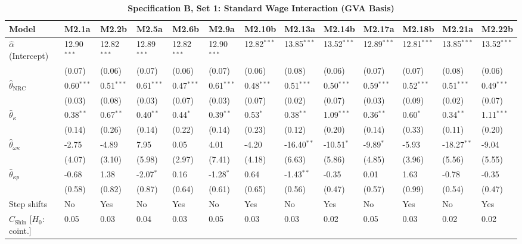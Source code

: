 \FloatBarrier
\begin{table}[h!]
\centering
\caption{\textbf{Specification B, Set 1: Standard Wage Interaction (GVA Basis)}}
\label{tab:specB_set1_gva_app}
\tiny
\setlength{\tabcolsep}{1.5pt}
\begin{tabular}{p{3.2cm}p{1.0cm}p{1.0cm}p{1.0cm}p{1.0cm}p{1.0cm}p{1.0cm}p{1.0cm}p{1.0cm}p{1.0cm}p{1.0cm}p{1.0cm}p{1.0cm}}
\toprule
Model & M2.1a & M2.2b & M2.5a & M2.6b & M2.9a & M2.10b & M2.13a & M2.14b & M2.17a & M2.18b & M2.21a & M2.22b \\
\midrule
$\hat{\alpha}$ (Intercept) & 12.90$^{***}$ & 12.82$^{***}$ & 12.89$^{***}$ & 12.82$^{***}$ & 12.90$^{***}$ & 12.82$^{***}$ & 13.85$^{***}$ & 13.52$^{***}$ & 12.89$^{***}$ & 12.81$^{***}$ & 13.85$^{***}$ & 13.52$^{***}$ \\
 & (0.07) & (0.06) & (0.07) & (0.06) & (0.07) & (0.06) & (0.08) & (0.06) & (0.07) & (0.07) & (0.08) & (0.06) \\
$\hat{\theta}_{\text{NRC}}$ & 0.60$^{***}$ & 0.51$^{***}$ & 0.61$^{***}$ & 0.47$^{***}$ & 0.61$^{***}$ & 0.48$^{***}$ & 0.51$^{***}$ & 0.50$^{***}$ & 0.59$^{***}$ & 0.52$^{***}$ & 0.51$^{***}$ & 0.49$^{***}$ \\
 & (0.03) & (0.08) & (0.03) & (0.07) & (0.03) & (0.07) & (0.02) & (0.07) & (0.03) & (0.09) & (0.02) & (0.07) \\
$\hat{\theta}_{\kappa}$ & 0.38$^{**}$ & 0.67$^{**}$ & 0.40$^{**}$ & 0.44$^{*}$ & 0.39$^{**}$ & 0.53$^{*}$ & 0.38$^{**}$ & 1.09$^{***}$ & 0.36$^{**}$ & 0.60$^{*}$ & 0.34$^{**}$ & 1.11$^{***}$ \\
 & (0.14) & (0.26) & (0.14) & (0.22) & (0.14) & (0.23) & (0.12) & (0.20) & (0.14) & (0.33) & (0.11) & (0.20) \\
$\hat{\theta}_{\omega\kappa}$ & -2.75 & -4.89 & 7.95 & 0.05 & 4.01 & -4.20 & -16.40$^{**}$ & -10.51$^{*}$ & -9.89$^{*}$ & -5.93 & -18.27$^{**}$ & -9.04 \\
 & (4.07) & (3.10) & (5.98) & (2.97) & (7.41) & (4.18) & (6.63) & (5.86) & (4.85) & (3.96) & (5.56) & (5.55) \\
$\hat{\theta}_{\kappa p}$ & -0.68 & 1.38 & -2.07$^{*}$ & 0.16 & -1.28$^{*}$ & 0.64 & -1.43$^{**}$ & -0.35 & 0.01 & 1.63 & -0.78 & -0.35 \\
 & (0.58) & (0.82) & (0.87) & (0.64) & (0.61) & (0.65) & (0.56) & (0.47) & (0.57) & (0.99) & (0.54) & (0.47) \\
\midrule
Step shifts & No & Yes & No & Yes & No & Yes & No & Yes & No & Yes & No & Yes \\
$C_{\text{Shin}}$ [$H_0$: coint.] & 0.05 & 0.03 & 0.04 & 0.03 & 0.05 & 0.03 & 0.03 & 0.02 & 0.05 & 0.03 & 0.02 & 0.02 \\

\end{tabular}
\end{table}
